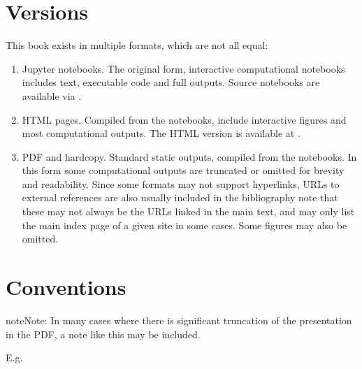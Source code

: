\documentclass[letterpaper,table,10pt,english]{jupyterBook}
\begin{document}
\section{Versions}
\label{\detokenize{frontmatter/book_versions_note:versions}}
\sphinxAtStartPar
This book exists in multiple formats, which are not all equal:
\begin{enumerate}
%
\item {} 
\sphinxAtStartPar
Jupyter notebooks. The original form, interactive computational notebooks includes text, executable code and full outputs. Source notebooks are available via .

\item {} 
\sphinxAtStartPar
HTML pages. Compiled from the notebooks, include interactive figures and most computational outputs. The HTML version is available at .

\item {} 
\sphinxAtStartPar
PDF and hard\sphinxhyphen{}copy. Standard static outputs, compiled from the notebooks. In this form some computational outputs are truncated or omitted for brevity and readability. Since some formats may not support hyperlinks, URLs to external references are also usually included in the bibliography \sphinxhyphen{} note that these may not always be the  URLs linked in the main text, and may only list the main index page of a given site in some cases. Some figures may also be omitted.

\end{enumerate}


\section{Conventions}
\label{\detokenize{frontmatter/book_versions_note:conventions}}
\begin{sphinxShadowBox}
\sphinxstylesidebartitle{}

\begin{sphinxadmonition}{note}{Note:}
\sphinxAtStartPar
In many cases where there is significant truncation of the presentation in the PDF, a note like this may be included.

\sphinxAtStartPar
E.g. 
\end{sphinxadmonition}
\end{sphinxShadowBox}
\end{document}
